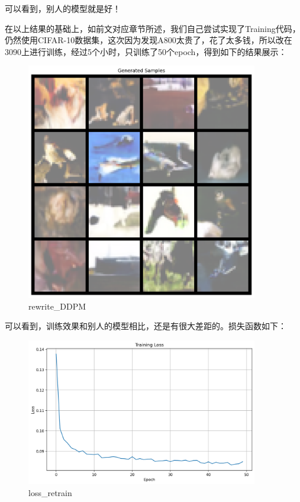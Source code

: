 \documentclass{ctexart}
\begin{document}
\noindent
可以看到，别人的模型就是好！

\noindent
在以上结果的基础上，如前文对应章节所述，我们自己尝试实现了Training代码，仍然使用CIFAR-10数据集，这次因为发现A800太贵了，花了太多钱，所以改在3090上进行训练，经过5个小时，只训练了50个epoch，得到如下的结果展示：
\begin{figure}[htb]
    \centering
    \includegraphics[width=0.9\textwidth]{epoch_50_samples_retrain.png}
    \caption{rewrite_DDPM}
    \label{fig:cifar10_grid}
\end{figure}

\noindent
可以看到，训练效果和别人的模型相比，还是有很大差距的。损失函数如下：
\begin{figure}[htb]
    \centering
    \includegraphics[width=0.9\textwidth]{loss_retrain.png}
    \caption{loss_retrain}
    \label{fig:loss_retrain}
\end{figure}
\end{document}
